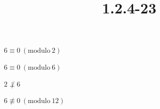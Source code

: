 \documentclass{article}
\title{1.2.4-23}
\begin{document}
\maketitle

\( 6 \equiv 0\ (\mathrm{modulo}\ 2) \)

\( 6 \equiv 0\ (\mathrm{modulo}\ 6) \)

\( 2 \not\perp 6 \)

\( 6 \not\equiv 0\ (\mathrm{modulo}\ 12) \)
\end{document}
